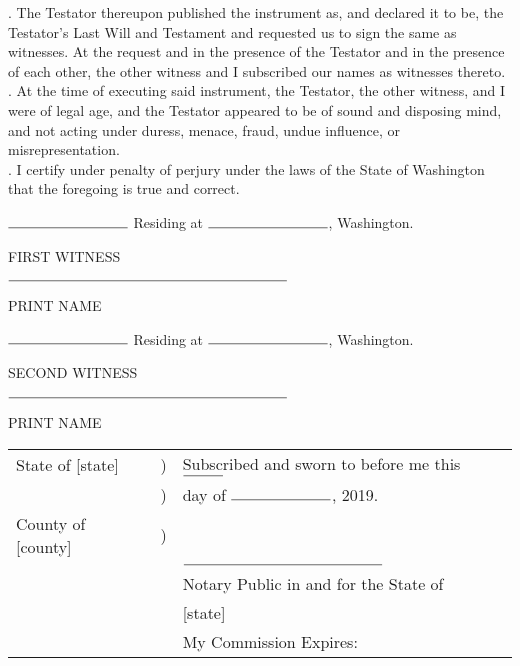 \documentclass[11.5pt]{article}
\begin{document}
. The Testator thereupon published the instrument as, and declared it to be, the Testator’s Last Will and Testament and requested us to sign the same as witnesses. At the request and in the presence of the Testator and in the presence of each other, the other witness and I subscribed our names as witnesses thereto.
\\

. At the time of executing said instrument, the Testator, the other witness, and I were of legal age, and the Testator appeared to be of sound and disposing mind, and not acting under duress, menace, fraud, undue influence, or misrepresentation.
\\

. I certify under penalty of perjury under the laws of the State of Washington that the foregoing is true and correct.
\\
\vspace{0.75cm}

$\rule{3cm}{0.15mm}$ Residing at $\rule{3cm}{0.15mm}$, Washington.

\hspace*{0mm}\phantom{}FIRST WITNESS
\vspace{0.75cm}

$\rule{7cm}{0.15mm}$

\hspace*{0mm}\phantom{}PRINT NAME
\vspace{0.75cm}

$\rule{3cm}{0.15mm}$ Residing at $\rule{3cm}{0.15mm}$, Washington.

\hspace*{0mm}\phantom{}SECOND WITNESS
\vspace{0.75cm}

$\rule{7cm}{0.15mm}$

\hspace*{0mm}\phantom{}PRINT NAME
\vspace{2cm}

\begin{tabular}{lcl}
State of [state] &  \hspace*{1cm} ) &  \hspace*{1cm} Subscribed and sworn to before me this $\rule{1cm}{0.15mm}$ \\
&   \hspace*{1cm} ) &  \hspace*{1cm} day of $\rule{2.5cm}{0.15mm}$, 2019. \\
County of [county] &  \hspace*{1cm} ) & \\
&&  \hspace*{1cm}$\rule{5cm}{0.15mm}$\\
&&  \hspace*{1cm} Notary Public in and for the State of \\
&&  \hspace*{1cm} [state] \\
&&  \hspace*{1cm} My Commission Expires:
\end{tabular}
\end{document}
